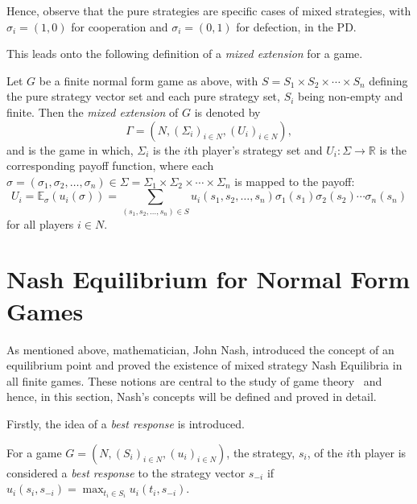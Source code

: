 Hence, observe that the pure
strategies are specific cases of mixed strategies, with \(\sigma_{i} = (1, 0)\)
for cooperation and \(\sigma_{i} = (0, 1)\) for defection, in the PD\@.

This leads onto the following definition of a \textit{mixed extension} for a
game.

\newpage
\begin{definition}
    Let \(G\) be a finite normal form game as above, with \(S = S_{1} \times
S_{2} \times \cdots \times S_{n}\) defining the pure strategy vector set and
each pure strategy set, \(S_{i}\) being non-empty and finite. Then the
\textit{mixed extension} of \(G\) is denoted by
\begin{equation}
    \Gamma = (N, {(\Sigma_{i})}_{i \in N}, {(U_{i})}_{i \in N}), 
\end{equation}
and is the game in which, \(\Sigma_{i}\) is the \(i\)th player's strategy set
and \(U_{i} : \Sigma \to \mathbb{R}\) is the corresponding payoff function,
where each \(\sigma = (\sigma_{1}, \sigma_{2}, \ldots, \sigma_{n}) \in \Sigma =
\Sigma_{1} \times \Sigma_{2} \times \cdots \times \Sigma_{n}\) is mapped to the
payoff:
\begin{equation}
    U_{i} = \mathbb{E}_{\sigma}(u_{i}(\sigma)) = \sum_{(s_{1}, s_{2}, \ldots, s_
    {n}) \in S}{u_{i}(s_{1}, s_{2}, \ldots, s_{n})\sigma_{1}(s_{1})\sigma_{2}(s_
    {2})\cdots\sigma_{n}(s_{n})} 
\end{equation}\label{eqn:mixed_payoff_function}
for all players \(i \in N\).
\end{definition}

\section{Nash Equilibrium for Normal Form Games}\label{sec:NE_for_Normal_Form_Games}
As mentioned above, mathematician, John Nash, introduced the concept of an
equilibrium point and proved the existence of mixed strategy Nash Equilibria in
all finite games. These notions are central to the study of game
theory~\cite{maschler_solan_zamir_2013} and hence, in this section, Nash's
concepts will be defined and proved in detail.

Firstly, the idea of a \textit{best response} is introduced.
\begin{definition}
    For a game \(G=(N, {(S_{i})}_{i \in N}, {(u_{i})}_{i \in N})\), the strategy,
\(s_{i}\), of the \(i\)th player is considered a \textit{best response} to the
strategy vector \(s_{-i}\) if \(u_{i}(s_{i}, s_{-i}) = \max_{t_{i} \in
S_{i}}u_{i}(t_{i}, s_{-i})\).
\end{definition}

